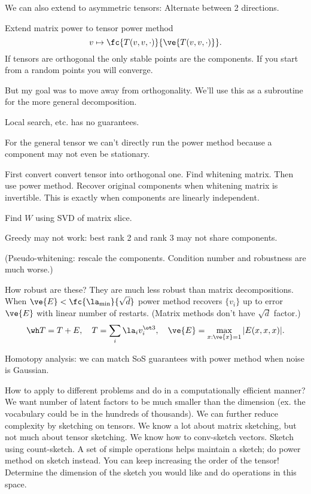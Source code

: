 We can also extend to asymmetric tensors:
Alternate between 2 directions.

Extend matrix power to tensor power method
$$
v\mapsto \fc{T(v,v,\cdot)}{\ve{T(v,v,\cdot)}}.
$$
If tensors are orthogonal the only stable points are the components. If you start from a random points you will converge.

But my goal was to move away from orthogonality. We'll use this as a subroutine for the more general decomposition.

Local search, etc. has no guarantees.

For the general tensor we can't directly run the power method because a component may not even be stationary.

First convert convert tensor into orthogonal one.
Find whitening matrix. Then use power method. Recover original components when whitening matrix is invertible. This is exactly when components are linearly independent.

Find $W$ using SVD of matrix slice.

Greedy may not work: best rank 2 and rank 3 may not share components.

(Pseudo-whitening: rescale the components. Condition number and robustness are much worse.)

How robust are these? They are much less robust than matrix decompositions. %
When $\ve{E}< \fc{\la_{\min}}{\sqrt d}$ power method recovers $\{v_i\}$ up to error $\ve{E}$ with linear number of restarts.
(Matrix methods don't have $\sqrt d$ factor.) 
$$\wh T = T+E,\quad T=\sum_i \la_iv_i^{\ot 3},\quad\ve{E}=\max_{x:\ve{x}=1}|E(x,x,x)|.$$

Homotopy analysis: we can match SoS guarantees with power method when noise is Gaussian. 

How to apply to different problems and do in a computationally efficient manner? 
We want number of latent factors to be much smaller than the dimension (ex. the vocabulary could be in the hundreds of thousands). We can further reduce complexity by sketching on tensors. We know a lot about matrix sketching, but not much about tensor sketching. We know how to conv-sketch vectors. Sketch using count-sketch. A set of simple operations helps maintain a sketch; do power method on sketch instead. You can keep increasing the order of the tensor! Determine the dimension of the sketch you would like and do operations in this space.

